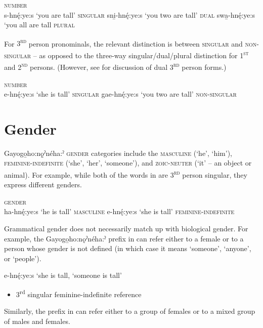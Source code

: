 \ea\label{ex:numex100} \textsc{number}\\
\ea s-hnę́:ye:s ‘you are tall’ \textsc{singular}
\ex sni̱-hnę́:ye:s ‘you two are tall’ \textsc{dual}
\ex swa̱-hnę́:ye:s ‘you all are tall  \textsc{plural}
\z
\z

For \textsc{3\textsuperscript{rd}} person pronominals, the relevant distinction is between \textsc{singular} and \textsc{non-singular} -- as opposed to the three-way singular/dual/plural distinction for \textsc{1\textsuperscript{st}} and \textsc{2\textsuperscript{nd}} persons. (However, see  for discussion of dual \textsc{3\textsuperscript{rd}} person forms.)

\ea\label{ex:numex101} \textsc{number}\\
\ea e-hnę́:ye:s ‘she is tall’ \textsc{singular}
\ex gae-hnę́:ye:s ‘you two are tall’ \textsc{non-singular}
\z
\z

\section{Gender} \label{Gender}
Gayogo̱ho:nǫ̱ˀnéha:ˀ \textsc{gender} categories include the \textsc{masculine} (‘he’, ‘him’), \textsc{femin\-ine-indefinite} (‘she’, ‘her’, ‘someone’), and \textsc{zoic-neuter} (‘it’ -- an object or animal). For example, while both of the words in   are \textsc{3\textsuperscript{rd}} person singular, they express different genders.

\ea\label{ex:gendex100} \textsc{gender}\\
\ea ha-hnę́:ye:s ‘he is tall’ \textsc{masculine}
\ex e-hnę́:ye:s ‘she is tall’ \textsc{feminine-indefinite}
\z
\z

Grammatical gender does not necessarily match up with biological gender. For example, the Gayogo̱ho:nǫˀnéha:ˀ prefix in  can refer either to a female or to a person whose gender is not defined (in which case it means ‘someone’, ‘anyone’, or ‘people’).

\ea\label{ex:gendex200} e-hnę́:ye:s ‘she is tall, ‘someone is tall’\\
\begin{itemize}
    \item 3\textsuperscript{rd} singular feminine-indefinite reference\\
\end{itemize}
\z

Similarly, the prefix in  can  refer either to a group of females or to a mixed group of males and females.

